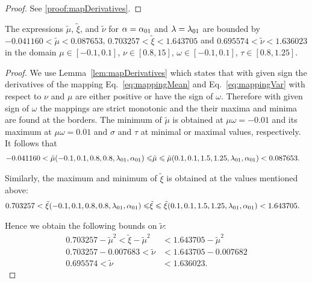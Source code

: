 \documentclass{article}
\newcommand\munn{{\tilde \mu}}
\newcommand\nunn{{\tilde \nu}}
\newcommand\xinn{{\tilde \xi}}
\renewcommand{\leq}{\leqslant}
\begin{document}
\begin{proof}
 See \ref{proof:mapDerivatives}.
\end{proof}


\begin{lemma}
\label{lem:boundsmeanvar}
The expressions $\munn$, $\xinn$, and $\nunn$
for
$\alpha = \alpha_{\rm 01}$ and $\lambda=\lambda_{\rm 01}$
are bounded by
$-0.041160 < \munn < 0.087653$,
$0.703257 < \xinn <1.643705$
and
$0.695574 < \nunn < 1.636023$ 
in the domain $\mu \in [-0.1,0.1]$, 
$\nu \in [0.8,15]$, $\omega \in [-0.1,0.1]$,  $\tau \in [0.8,1.25]$.
\end{lemma}


\begin{proof}
We use Lemma~\ref{lem:mapDerivatives} which states that with given
sign the derivatives of the mapping   Eq.~\eqref{eq:mappingMean}
and Eq.~\eqref{eq:mappingVar} with respect to  $\nu$
and $\mu$ are either positive or have the sign of
$\omega$.
Therefore with given sign of $\omega$ the mappings are strict monotonic and
the their maxima and minima are found at the borders.  The minimum of $\munn$ is obtained at
$\mu \omega = -0.01$ and its maximum at $\mu \omega=0.01$ and $\sigma$ and $\tau$ at minimal or maximal values, respectively.
It follows that
\begin{align}
-0.041160 < \munn(-0.1,0.1, 0.8, 0.8, \lambda_{\rm 01}, \alpha_{\rm 01})  \leq  & \munn \leq \munn(0.1,0.1,1.5, 1.25, \lambda_{\rm 01}, \alpha_{\rm 01}) < 0.087653.
\end{align}

Similarly, the maximum and minimum of $\xinn$ is obtained at the values mentioned above:
\begin{align}
0.703257 <\xinn(-0.1,0.1, 0.8, 0.8, \lambda_{\rm 01}, \alpha_{\rm 01})  \leq  & \xinn \leq \xinn(0.1,0.1,1.5, 1.25, \lambda_{\rm 01}, \alpha_{\rm 01}) < 1.643705. 
\end{align}

Hence we obtain the following bounds on $\nunn$:
\begin{align}
0.703257 - \munn^2 <  \xinn - \munn^2  &  < 1.643705 - \munn^2  \\ \nonumber
0.703257 - 0.007683 <  \nunn  &  < 1.643705 - 0.007682   \\ \nonumber
0.695574 <  \nunn  &  < 1.636023 . 
\end{align}


\end{proof}
\end{document}
